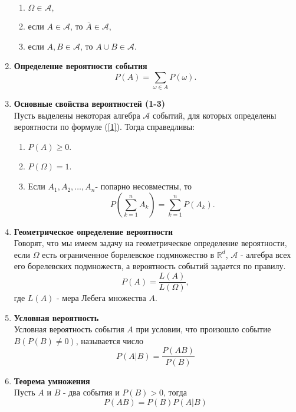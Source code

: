 \documentclass[A4]{article}
\begin{document}
\begin{enumerate}
\begin{enumerate}
		\item $\Omega\in\mathcal{A},$
		\item если $A\in\mathcal{A}$, то $\bar{A}\in\mathcal{A}$,
		\item если $A,B\in\mathcal{A}$, то $A\cup B\in\mathcal{A}$.
	\end{enumerate}
	\item \textbf{Определение вероятности события}\\
	\begin{equation}
	\label{1}
	P(A)=\sum_{\omega\in A} P(\omega).
	\end{equation}
	\item \textbf{Основные свойства вероятностей (1-3)}\\
	Пусть выделены некоторая алгебра $\mathcal{A}$ событий, для которых определены вероятности по формуле (\ref{1}). Тогда справедливы:
	\begin{enumerate}
		\item $P(A)\ge0$.
		\item $P(\Omega)=1$.
		\item Если $A_1,A_2,\ldots,A_n$- попарно несовместны, то 
		\begin{equation}
		P(\sum_{k=1}^{n} A_k)=\sum_{k=1}^{n} P(A_k).
		\end{equation}
	\end{enumerate}
	\item \textbf{Геометрическое определение вероятности}\\
	Говорят, что мы имеем задачу на геометрическое определение вероятности, если $\Omega$  есть ограниченное борелевское подмножество в ${\mathbb{R}}^d$, $\mathcal{A}$ - алгебра всех его борелевских подмножеств, а вероятность событий задается по правилу. 
	\begin{equation}
	P(A)=\frac{L(A)}{L(\Omega)},
	\end{equation}
	где $L(A)$ - мера Лебега множества $A$.
	\item \textbf{Условная вероятность}\\
	Условная вероятность события $A$  при условии, что произошло событие $B(P(B)\ne0)$, называется число
	\begin{equation}
	P(A|B)=\frac{P(AB)}{P(B)}
	\end{equation}
	\item \textbf{Теорема умножения}\\
	Пусть $A$ и $B$ - два события и $P(B)>0$, тогда
	\begin{equation}
	P(AB)=P(B)P(A|B)
	\end{equation}

\end{enumerate}
\end{document}
